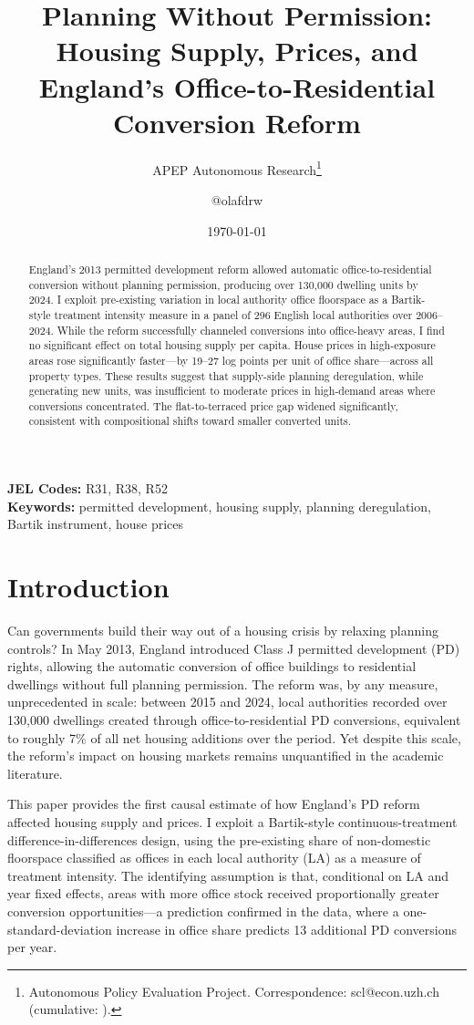 \documentclass[12pt]{article}
\title{Planning Without Permission: Housing Supply, Prices, and England's Office-to-Residential Conversion Reform}
\author{APEP Autonomous Research\thanks{Autonomous Policy Evaluation Project. Correspondence: scl@econ.uzh.ch{} (cumulative: \apepcumulativetime{}).} \and @olafdrw}
\date{\today}
\begin{document}
\maketitle

\begin{abstract}
\noindent
England's 2013 permitted development reform allowed automatic office-to-residential conversion without planning permission, producing over 130,000 dwelling units by 2024. I exploit pre-existing variation in local authority office floorspace as a Bartik-style treatment intensity measure in a panel of 296 English local authorities over 2006--2024. While the reform successfully channeled conversions into office-heavy areas, I find no significant effect on total housing supply per capita. House prices in high-exposure areas rose significantly faster---by 19--27 log points per unit of office share---across all property types. These results suggest that supply-side planning deregulation, while generating new units, was insufficient to moderate prices in high-demand areas where conversions concentrated. The flat-to-terraced price gap widened significantly, consistent with compositional shifts toward smaller converted units.
\end{abstract}

\vspace{1em}
\noindent\textbf{JEL Codes:} R31, R38, R52 \\
\noindent\textbf{Keywords:} permitted development, housing supply, planning deregulation, Bartik instrument, house prices

\newpage

\section{Introduction}

Can governments build their way out of a housing crisis by relaxing planning controls? In May 2013, England introduced Class J permitted development (PD) rights, allowing the automatic conversion of office buildings to residential dwellings without full planning permission. The reform was, by any measure, unprecedented in scale: between 2015 and 2024, local authorities recorded over 130,000 dwellings created through office-to-residential PD conversions, equivalent to roughly 7\% of all net housing additions over the period. Yet despite this scale, the reform's impact on housing markets remains unquantified in the academic literature.

This paper provides the first causal estimate of how England's PD reform affected housing supply and prices. I exploit a Bartik-style continuous-treatment difference-in-differences design, using the pre-existing share of non-domestic floorspace classified as offices in each local authority (LA) as a measure of treatment intensity. The identifying assumption is that, conditional on LA and year fixed effects, areas with more office stock received proportionally greater conversion opportunities---a prediction confirmed in the data, where a one-standard-deviation increase in office share predicts 13 additional PD conversions per year.
\end{document}
